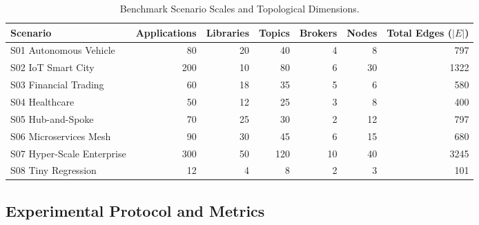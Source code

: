 \begin{table}[htbp]
\centering
\footnotesize
\setlength{\tabcolsep}{3.5pt}
\caption{Benchmark Scenario Scales and Topological Dimensions.}
\label{tab:scenarios}
\begin{tabular}{lrrrrrr}
\toprule
\textbf{Scenario} & \textbf{Applications} & \textbf{Libraries} & \textbf{Topics} & \textbf{Brokers} & \textbf{Nodes} & \textbf{Total Edges ($|E|$)} \\
\midrule
S01 Autonomous Vehicle & 80 & 20 & 40 & 4 & 8 & 797 \\
S02 IoT Smart City & 200 & 10 & 80 & 6 & 30 & 1322 \\
S03 Financial Trading & 60 & 18 & 35 & 5 & 6 & 580 \\
S04 Healthcare & 50 & 12 & 25 & 3 & 8 & 400 \\
S05 Hub-and-Spoke & 70 & 25 & 30 & 2 & 12 & 797 \\
S06 Microservices Mesh & 90 & 30 & 45 & 6 & 15 & 680 \\
S07 Hyper-Scale Enterprise & 300 & 50 & 120 & 10 & 40 & 3245 \\
S08 Tiny Regression & 12 & 4 & 8 & 2 & 3 & 101 \\
\bottomrule
\end{tabular}
\end{table}

\subsection{Experimental Protocol and Metrics}
\label{sec:exp:protocol}

